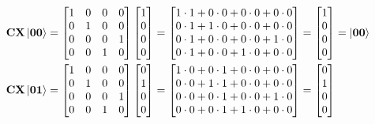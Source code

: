 \begin{figure}[H]
    \centering
    \begin{align*}
        \mathbf{CX}\ket{\mathbf{0}\mathbf{0}}&=\begin{bmatrix} 1 & 0 & 0 & 0\\ 0 & 1 & 0 & 0\\ 0 & 0 & 0 & 1\\ 0 & 0 & 1 & 0\\ \end{bmatrix}
        \begin{bmatrix}
            1\\
            0\\
            0\\
            0\\
        \end{bmatrix}
        =
        \begin{bmatrix}
            1\cdot 1 + 0\cdot 0 + 0\cdot 0 + 0\cdot 0\\
            0\cdot 1 + 1\cdot 0 + 0\cdot 0 + 0\cdot 0\\
            0\cdot 1 + 0\cdot 0 + 0\cdot 0 + 1\cdot 0\\
            0\cdot 1 + 0\cdot 0 + 1\cdot 0 + 0\cdot 0\\
        \end{bmatrix}=
        \begin{bmatrix}
            1\\
            0\\
            0\\
            0\\
        \end{bmatrix}
        =\ket{\mathbf{0}\mathbf{0}}\\
        \mathbf{CX}\ket{\mathbf{0}\mathbf{1}}&=\begin{bmatrix} 1 & 0 & 0 & 0\\ 0 & 1 & 0 & 0\\ 0 & 0 & 0 & 1\\ 0 & 0 & 1 & 0\\ \end{bmatrix}
        \begin{bmatrix}
            0\\
            1\\
            0\\
            0\\
        \end{bmatrix}
        =
        \begin{bmatrix}
            1\cdot 0 + 0\cdot 1 + 0\cdot 0 + 0\cdot 0\\
            0\cdot 0 + 1\cdot 1 + 0\cdot 0 + 0\cdot 0\\
            0\cdot 0 + 0\cdot 1 + 0\cdot 0 + 1\cdot 0\\
            0\cdot 0 + 0\cdot 1 + 1\cdot 0 + 0\cdot 0\\
        \end{bmatrix}=
        \begin{bmatrix}
            0\\
            1\\
            0\\
            0\\

\end{bmatrix}
\end{align*}
\end{figure}
